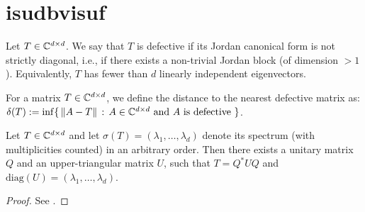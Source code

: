 \chapter{isudbvisuf}

\cite{Demmel1983}
\begin{definition} %
    Let $T \in \mathbb{C}^{d\times d}$. We say that $T$ is defective if its Jordan canonical form is not strictly diagonal, i.e., if there exists a non-trivial Jordan block (of dimension $>1$). Equivalently, $T$ has fewer than $d$ linearly independent eigenvectors.
\end{definition}
\begin{definition}
    For a matrix $T \in \mathbb{C}^{d \times d}$, we define the distance to the nearest defective matrix as:
    $\delta(T) := \inf \{\,\|A - T\| \, : \, A \in \mathbb{C}^{d \times d} \text{ and } A \text{ is defective }\}$.
\end{definition}

\begin{theorem}[Schur]
    Let $T\in\mathbb{C}^{d\times d}$ and let $\sigma(T) = \left(\lambda_1, \dots, \lambda_d\right)$ denote its spectrum (with multiplicities counted) in an arbitrary order. Then there exists a unitary matrix $Q$ and an upper-triangular matrix $U$, such that $T = Q^*UQ$ and $\mathrm{diag}(U) = \left(\lambda_1, \dots, \lambda_d\right)$.
\end{theorem}
\begin{proof}
    See \cite[p. 79]{HornJohnson1985}.
\end{proof}


